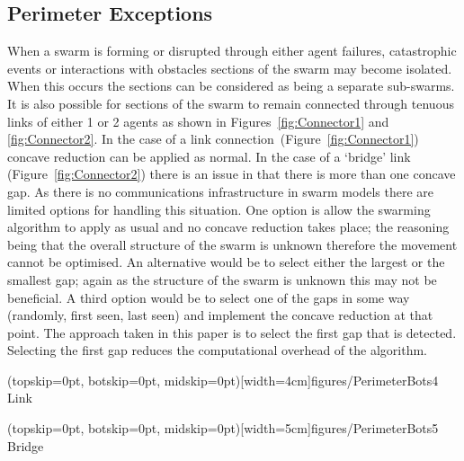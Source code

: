 \documentclass{ieeeaccess}
\begin{document}
\subsection{Perimeter Exceptions}\label{concave:Exceptions}
When a swarm is forming or disrupted through either agent failures, catastrophic events or interactions with obstacles sections of the swarm may become isolated. When this occurs the sections can be considered as being a separate sub-swarms. It is also possible for sections of the swarm to remain connected through tenuous links of either 1 or 2 agents as shown in Figures~\ref{fig:Connector1} and \ref{fig:Connector2}. In the case of a link connection~(Figure~\ref{fig:Connector1}) concave reduction can be applied as normal. In the case of a `bridge' link (Figure~\ref{fig:Connector2}) there is an issue in that there is more than one concave gap. As there is no communications infrastructure in swarm models there are limited options for handling this situation. One option is allow the swarming algorithm to apply as usual and no concave reduction takes place; the reasoning being that the overall structure of the swarm is unknown therefore the movement cannot be optimised. An alternative would be to select either the largest or the smallest gap; again as the structure of the swarm is unknown this may not be beneficial. A third option would be to select one of the gaps in some way (randomly, first seen, last seen) and implement the concave reduction at that point. The approach taken in this paper is to select the first gap that is detected. Selecting the first gap reduces the computational overhead of the algorithm.

\Figure[t!](topskip=0pt, botskip=0pt, midskip=0pt)[width=4cm]{figures/PerimeterBots4}
{Link\label{fig:Connector1}}


\Figure[t!](topskip=0pt, botskip=0pt, midskip=0pt)[width=5cm]{figures/PerimeterBots5}
{Bridge\label{fig:Connector2}}

\end{document}
